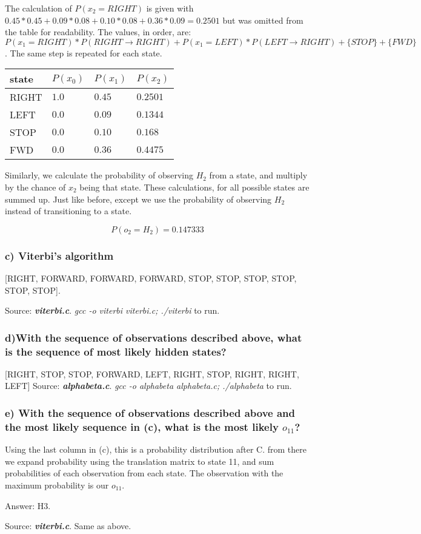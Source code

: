 \documentclass[a4paper] {article}
\begin{document}
		The calculation of $P(x_2=RIGHT)$ is given with $0.45*0.45+0.09*0.08+0.10*0.08+0.36*0.09 = 0.2501 $ but was omitted from the table for readability. The values, in order, are: $P(x_1 = RIGHT)*P(RIGHT\rightarrow RIGHT) + P(x_1 = LEFT)*P(LEFT\rightarrow RIGHT) + \{STOP\} + \{FWD\}$. The same step is repeated for each state.
		\begin{center}
		\begin{tabular}{|l||l|l|l|}
			\hline
			state & $P(x_0)$ & $P(x_1)$ & $P(x_2)$ \\
			\hline
			\hline
			RIGHT & $1.0$ & $0.45$ & $0.2501$ \\
			LEFT & $0.0$ & $0.09$ & $0.1344$ \\
			STOP & $0.0$ & $0.10$ & $0.168$ \\
			FWD & $0.0$ & $0.36$ & $0.4475$ \\
			\hline
		\end{tabular}
		\end{center}

		Similarly, we calculate the probability of observing $H_2$ from a state, and multiply by the chance of $x_2$ being that state. These calculations, for all possible states are summed up. Just like before, except we use the probability of observing $H_2$ instead of transitioning to a state.

		$$P(o_2 = H_2) = 0.147333$$

	\subsubsection*{c) Viterbi's algorithm}

		[RIGHT, FORWARD, FORWARD, FORWARD, STOP, STOP, STOP, STOP, STOP, STOP].

		Source: \emph{\textbf{viterbi.c}}. \emph{gcc -o viterbi viterbi.c; ./viterbi} to run.

	\subsubsection*{d)With the sequence of observations described above, what is the sequence
	of most likely hidden states?}

		[RIGHT, STOP, STOP, FORWARD, LEFT, RIGHT, STOP, RIGHT, RIGHT, LEFT]
		Source: \emph{\textbf{alphabeta.c}}. \emph{gcc -o alphabeta alphabeta.c; ./alphabeta} to run.

	\subsubsection*{e) With the sequence of observations described above and the most likely
	sequence in (c), what is the most likely $o_{11}$?}
		Using the last column in (c), this is a probability distribution after C. from there we expand probability using the translation matrix to state 11, and sum probabilities of each observation from each state. The observation with the maximum probability is our $o_{11}$.
		
		Answer: H3.

		Source: \emph{\textbf{viterbi.c}}. Same as above.
\end{document}
